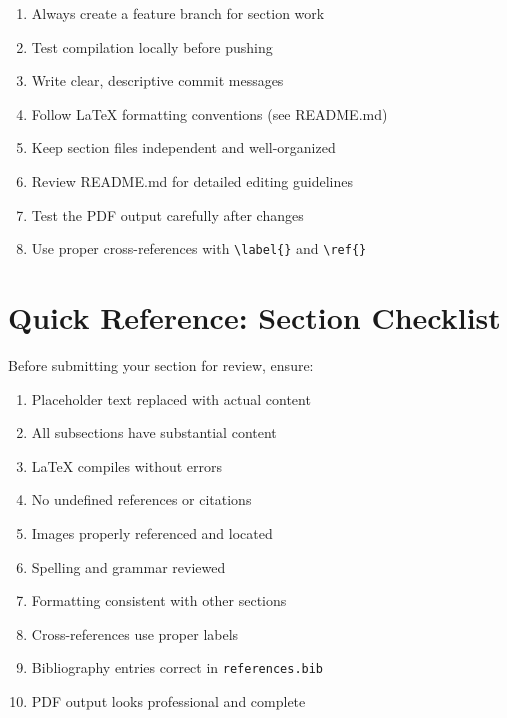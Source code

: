 \documentclass[12pt]{article}
\begin{document}
\begin{enumerate}
    \item Always create a feature branch for section work
    \item Test compilation locally before pushing
    \item Write clear, descriptive commit messages
    \item Follow LaTeX formatting conventions (see README.md)
    \item Keep section files independent and well-organized
    \item Review README.md for detailed editing guidelines
    \item Test the PDF output carefully after changes
    \item Use proper cross-references with \texttt{\textbackslash label\{\}} and \texttt{\textbackslash ref\{\}}
\end{enumerate}

\newpage

\section*{Quick Reference: Section Checklist}

Before submitting your section for review, ensure:

\begin{enumerate}
    \item[\checkmark] Placeholder text replaced with actual content
    \item[\checkmark] All subsections have substantial content
    \item[\checkmark] LaTeX compiles without errors
    \item[\checkmark] No undefined references or citations
    \item[\checkmark] Images properly referenced and located
    \item[\checkmark] Spelling and grammar reviewed
    \item[\checkmark] Formatting consistent with other sections
    \item[\checkmark] Cross-references use proper labels
    \item[\checkmark] Bibliography entries correct in \texttt{references.bib}
    \item[\checkmark] PDF output looks professional and complete
\end{enumerate}
\end{document}
